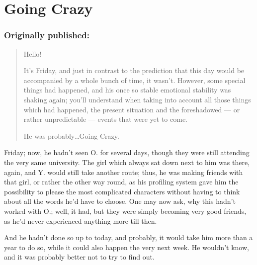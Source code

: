 \chapter{Going Crazy}
\label{cha:going-crazy}
\subsection*{Originally published: }
\begin{quote}
Hello!

It's Friday, and just in contrast to the prediction that this day would be accompanied by a whole bunch of time, it wasn't. However, some special things had happened, and his once so stable emotional stability was shaking again; you'll understand when taking into account all those things which had happened, the present situation and the foreshadowed --- or rather unpredictable --- events that were yet to come. 

He was probably\ldots Going Crazy.
\end{quote}

Friday; now, he hadn't seen O. for several days, though they were still attending the very same university. The girl which always sat down next to him was there, again, and Y. would still take another route; thus, he was making friends with that girl, or rather the other way round, as his profiling system gave him the possibility to please the most complicated characters without having to think about all the words he'd have to choose. One may now ask, why this hadn't worked with O.; well, it had, but they were simply becoming very good friends, as he'd never experienced anything more till then.

And he hadn't done so up to today, and probably, it would take him more than a year to do so, while it could also happen the very next week. He wouldn't know, and it was probably better not to try to find out.

